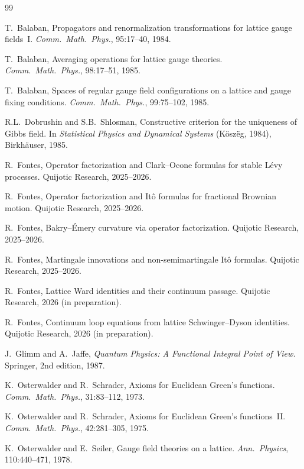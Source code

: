 \documentclass[11pt]{article}
\theoremstyle{definition}
\newcommand{\1}{\mathbf{1}}
\begin{document}


\begin{thebibliography}{99}

T.~Balaban,
\newblock Propagators and renormalization transformations for lattice gauge fields~I.
\newblock \emph{Comm.\ Math.\ Phys.}, 95:17--40, 1984.

T.~Balaban,
\newblock Averaging operations for lattice gauge theories.
\newblock \emph{Comm.\ Math.\ Phys.}, 98:17--51, 1985.

T.~Balaban,
\newblock Spaces of regular gauge field configurations on a lattice and gauge fixing conditions.
\newblock \emph{Comm.\ Math.\ Phys.}, 99:75--102, 1985.

R.L.~Dobrushin and S.B.~Shlosman,
\newblock Constructive criterion for the uniqueness of Gibbs field.
\newblock In \emph{Statistical Physics and Dynamical Systems} (K\"osz\"eg, 1984),
Birkh\"auser, 1985.

R.~Fontes,
\newblock Operator factorization and Clark--Ocone formulas for stable L\'evy processes.
\newblock Quijotic Research, 2025--2026.

R.~Fontes,
\newblock Operator factorization and It\^o formulas for fractional Brownian motion.
\newblock Quijotic Research, 2025--2026.

R.~Fontes,
\newblock Bakry--\'Emery curvature via operator factorization.
\newblock Quijotic Research, 2025--2026.

R.~Fontes,
\newblock Martingale innovations and non-semimartingale It\^o formulas.
\newblock Quijotic Research, 2025--2026.

R.~Fontes,
\newblock Lattice Ward identities and their continuum passage.
\newblock Quijotic Research, 2026 (in preparation).

R.~Fontes,
\newblock Continuum loop equations from lattice Schwinger--Dyson identities.
\newblock Quijotic Research, 2026 (in preparation).

J.~Glimm and A.~Jaffe,
\newblock \emph{Quantum Physics: A Functional Integral Point of View.}
\newblock Springer, 2nd edition, 1987.

K.~Osterwalder and R.~Schrader,
\newblock Axioms for {E}uclidean {G}reen's functions.
\newblock \emph{Comm.\ Math.\ Phys.}, 31:83--112, 1973.

K.~Osterwalder and R.~Schrader,
\newblock Axioms for {E}uclidean {G}reen's functions~{II}.
\newblock \emph{Comm.\ Math.\ Phys.}, 42:281--305, 1975.

K.~Osterwalder and E.~Seiler,
\newblock Gauge field theories on a lattice.
\newblock \emph{Ann.\ Physics}, 110:440--471, 1978.

\end{thebibliography}
\end{document}
